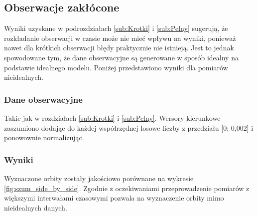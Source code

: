 \FloatBarrier
\subsection{Obserwacje zakłócone}

Wyniki uzyskane w podrozdziałach \ref{sub:Krotki} i \ref{sub:Pelny} sugerują, że rozkładanie obserwacji w czasie może nie mieć wpływu na wyniki, ponieważ nawet dla krótkich obserwacji błędy praktycznie nie istnieją. Jest to jednak spowodowane tym, że dane obserwacyjne są generowane w sposób idealny na podstawie idealnego modelu. Poniżej przedstawiono wyniki dla pomiarów nieidealnych.

     \subsubsection{Dane obserwacyjne}
    Takie jak w rozdziałach \ref{sub:Krotki} i \ref{sub:Pelny}. Wersory kierunkowe zaszumiono dodając do każdej współrzędnej losowe liczby z przedziału [0; 0,002] i ponowownie normalizując.
    
    \subsubsection{Wyniki}
    Wyznaczone orbity zostały jakościowo porównane na wykresie \ref{fig:szum_side_by_side}. Zgodnie z oczekiwaniami przeprowadzenie pomiarów z większymi interwałami czasowymi pozwala na wyznaczenie orbity mimo nieidealnych danych.

